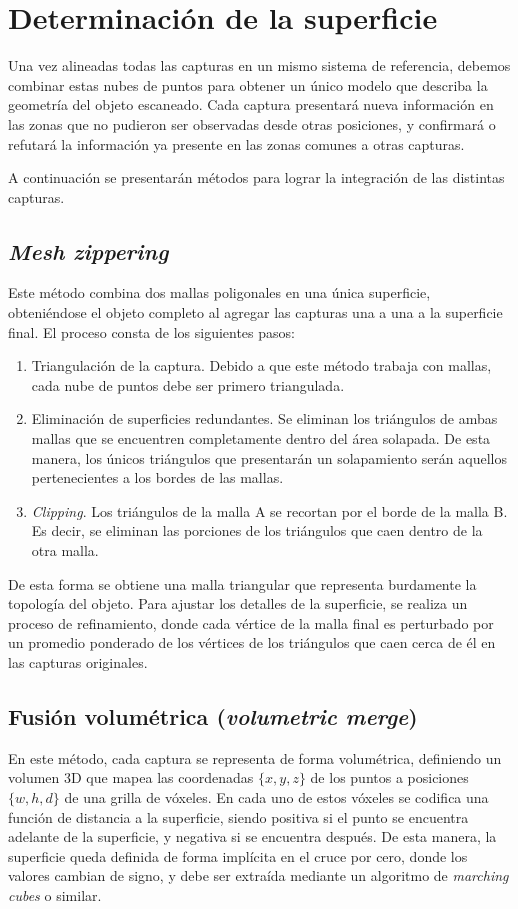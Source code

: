 \section{Determinación de la superficie}
Una vez alineadas todas las capturas en un mismo sistema de referencia,
debemos combinar estas nubes de puntos para obtener un único modelo
que describa la geometría del objeto escaneado.
Cada captura presentará nueva información en las zonas
que no pudieron ser observadas desde otras posiciones,
y confirmará o refutará la información ya presente en las zonas comunes a otras capturas.

A continuación se presentarán métodos para lograr la integración de las distintas capturas.

\subsection{\emph{Mesh zippering}}
Este método combina dos mallas poligonales en una única superficie,
obteniéndose el objeto completo al agregar las capturas una a una a la superficie final.
El proceso consta de los siguientes pasos:
\begin{enumerate}
	\item Triangulación de la captura.
		Debido a que este método trabaja con mallas, cada nube de puntos debe ser primero triangulada.
	\item Eliminación de superficies redundantes.
		Se eliminan los triángulos de ambas mallas que se encuentren completamente dentro del área solapada.
		De esta manera, los únicos triángulos que presentarán un solapamiento
		serán aquellos pertenecientes a los bordes de las mallas.
	\item \emph{Clipping}.
		Los triángulos de la malla A se recortan por el borde de la malla B.
		Es decir, se eliminan las porciones de los triángulos que caen dentro de la otra malla.
\end{enumerate}

De esta forma se obtiene una malla triangular que representa burdamente la topología del objeto.
Para ajustar los detalles de la superficie, se realiza un proceso de refinamiento,
donde cada vértice de la malla final es perturbado por un promedio ponderado
de los vértices de los triángulos que caen cerca de él en las capturas originales\cite{Turk:1994:ZPM:192161.192241}.


\subsection{Fusión volumétrica (\emph{volumetric merge})}
En este método, cada captura se representa de forma volumétrica,
definiendo un volumen 3D que mapea las coordenadas $\{x, y, z\}$ de los puntos a posiciones $\{w, h, d\}$
de una grilla de vóxeles.
En cada uno de estos vóxeles se codifica una función de distancia a la superficie,
siendo positiva si el punto se encuentra adelante de la superficie, y negativa si se encuentra después.
De esta manera, la superficie queda definida de forma implícita en el cruce por cero,
donde los valores cambian de signo, y debe ser extraída
mediante un algoritmo de \emph{marching cubes} o similar.


